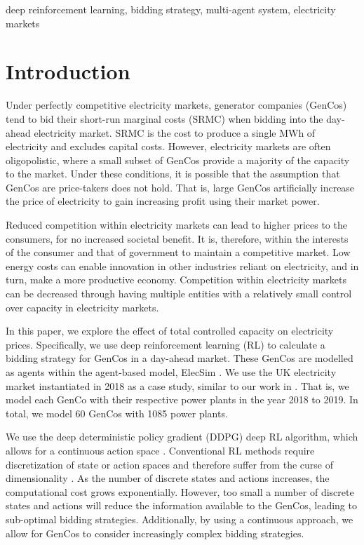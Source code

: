 \documentclass[conference]{IEEEtran}
\begin{document}
\begin{IEEEkeywords}
deep reinforcement learning, bidding strategy, multi-agent system, electricity markets
\end{IEEEkeywords}

\section{Introduction}
\label{sec:introduction}

Under perfectly competitive electricity markets, generator companies (GenCos) tend to bid their short-run marginal costs (SRMC) when bidding into the day-ahead electricity market. SRMC is the cost to produce a single MWh of electricity and excludes capital costs. However, electricity markets are often oligopolistic, where a small subset of GenCos provide a majority of the capacity to the market. Under these conditions, it is possible that the assumption that GenCos are price-takers does not hold. That is, large GenCos artificially increase the price of electricity to gain increasing profit using their market power. 

Reduced competition within electricity markets can lead to higher prices to the consumers, for no increased societal benefit. It is, therefore, within the interests of the consumer and that of government to maintain a competitive market. Low energy costs can enable innovation in other industries reliant on electricity, and in turn, make a more productive economy. Competition within electricity markets can be decreased through having multiple entities with a relatively small control over capacity in electricity markets. 

In this paper, we explore the effect of total controlled capacity on electricity prices. Specifically, we use deep reinforcement learning (RL) to calculate a bidding strategy for GenCos in a day-ahead market. These GenCos are modelled as agents within the agent-based model, ElecSim \cite{Kell, Kell2020}. We use the UK electricity market instantiated in 2018 as a case study, similar to our work in \cite{Kell2019a}. That is, we model each GenCo with their respective power plants in the year 2018 to 2019. In total, we model 60 GenCos with 1085 power plants.

We use the deep deterministic policy gradient (DDPG) deep RL algorithm, which allows for a continuous action space \cite{Hunt2016}. Conventional RL methods require discretization of state or action spaces and therefore suffer from the curse of dimensionality \cite{Ye2020a}. As the number of discrete states and actions increases, the computational cost grows exponentially. However, too small a number of discrete states and actions will reduce the information available to the GenCos, leading to sub-optimal bidding strategies. Additionally, by using a continuous approach, we allow for GenCos to consider increasingly complex bidding strategies. 
\end{document}
